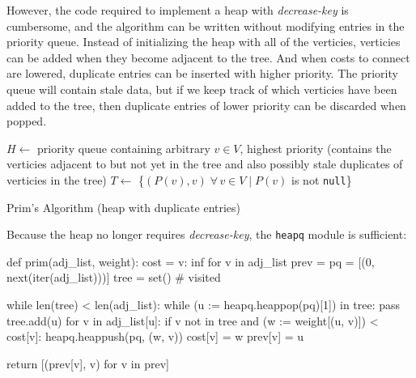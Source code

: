 \documentclass[12pt, titlepage]{article}
\begin{document}
However, the code required to implement a heap with \textit{decrease-key} is cumbersome, and the algorithm can be written without modifying entries in the priority queue. Instead of initializing the heap with all of the verticies, verticies can be added when they become adjacent to the tree. And when costs to connect are lowered, duplicate entries can be inserted with higher priority. The priority queue will contain stale data, but if we keep track of which verticies have been added to the tree, then duplicate entries of lower priority can be discarded when popped. \\

\begin{algorithm}[H]
  \SetAlgoLined
  \DontPrintSemicolon
  $H \longleftarrow$\hspace{0.5mm} priority queue containing arbitrary $v\in V$, highest priority\;
  \hspace{13mm}(contains the verticies adjacent to but not yet in the tree and\;
  \hspace{13mm}also possibly stale duplicates of verticies in the tree)\;
  $T \longleftarrow$\hspace{0.5mm} \{$(P(v), v)\;\forall\,v\in V\mid P(v)$ is not \texttt{null}\}\;
  \;
    \caption{Prim's Algorithm (heap with duplicate entries)}
\end{algorithm} \medskip

Because the heap no longer requires \textit{decrease-key}, the \texttt{heapq} module is sufficient: \medskip

\begin{python}
def prim(adj_list, weight):
    cost = {v: inf for v in adj_list}
    prev = {}
    pq = [(0, next(iter(adj_list)))]
    tree = set()  # visited

    while len(tree) < len(adj_list):
        while (u := heapq.heappop(pq)[1]) in tree: pass
        tree.add(u)
        for v in adj_list[u]:
            if v not in tree and (w := weight[(u, v)]) < cost[v]:
                heapq.heappush(pq, (w, v))
                cost[v] = w
                prev[v] = u
        
    return [(prev[v], v) for v in prev]
\end{python}
\end{document}
